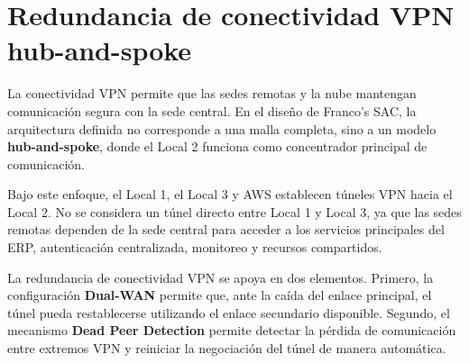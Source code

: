 \documentclass[11pt, a4paper, oneside]{report}
\begin{document}
\section{Redundancia de conectividad VPN hub-and-spoke}

La conectividad VPN permite que las sedes remotas y la nube mantengan comunicación segura con la sede central. En el diseño de Franco's SAC, la arquitectura definida no corresponde a una malla completa, sino a un modelo \textbf{hub-and-spoke}, donde el Local 2 funciona como concentrador principal de comunicación.

Bajo este enfoque, el Local 1, el Local 3 y AWS establecen túneles VPN hacia el Local 2. No se considera un túnel directo entre Local 1 y Local 3, ya que las sedes remotas dependen de la sede central para acceder a los servicios principales del ERP, autenticación centralizada, monitoreo y recursos compartidos.

La redundancia de conectividad VPN se apoya en dos elementos. Primero, la configuración \textbf{Dual-WAN} permite que, ante la caída del enlace principal, el túnel pueda restablecerse utilizando el enlace secundario disponible. Segundo, el mecanismo \textbf{Dead Peer Detection} permite detectar la pérdida de comunicación entre extremos VPN y reiniciar la negociación del túnel de manera automática.

\renewcommand{\arraystretch}{1.3}
\footnotesize
{}
\end{document}
